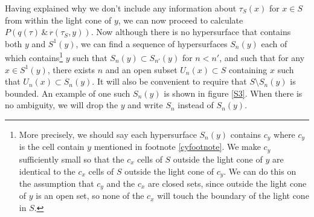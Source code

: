 Having explained why we don't include any information about $\tau_S(x)$ for $x\in S$ from within the light cone of $y$, we can now proceed to calculate  $P(q(\tau) \, \&\,  r(\tau_S,y))$. Now although there is no hypersurface that contains both $y$ and $S^1(y)$, we can find a sequence of hypersurfaces $S_n(y)$ each of which contains\footnote{More precisely, we should say each hypersurface $S_n(y)$ contains $c_y$ where $c_y$ is the cell contain $y$ mentioned in footnote \ref{cyfootnote}. We make $c_y$ sufficiently small so that the $c_x$ cells of $S$ outside the light cone of $y$ are identical to the $c_x$ cells of $S$ outside the light cone of $c_y$. We can do this on the assumption that $c_y$ and the $c_x$ are closed sets, since outside the light cone of $y$ is an open set, so none of the $c_x$ will touch the boundary of the light cone in $S$. } $y$ such that\label{siydef} $S_n(y)\subset S_{n'}(y)$ for $n<n'$, and such that for any $x\in S^1(y)$, there exists $n$ and an open subset $U_n(x)\subset S$ containing $x$ such that $U_n(x)\subset S_n(y)$. It will also be convenient to require that $S\setminus S_n(y)$ is bounded. An example of one such $S_n(y)$ is shown in figure \ref{S3}. When there is no ambiguity, we will drop the $y$ and write $S_n$ instead of $S_n(y)$. 
